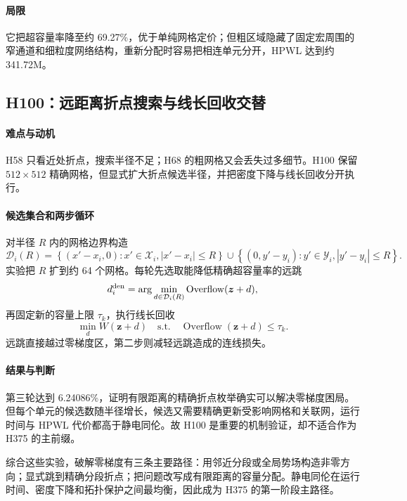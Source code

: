 \documentclass[UTF8,a4paper,11pt]{ctexrep}
\newcommand{\Overflow}{\operatorname{Overflow}}
\begin{document}
\paragraph{局限}
它把超容量率降至约 69.27\%，优于单纯网格定价；但粗区域隐藏了固定宏周围的窄通道和细粒度网络结构，重新分配时容易把相连单元分开，HPWL 达到约 341.72M。

\subsection{H100：远距离折点搜索与线长回收交替}
\paragraph{难点与动机}
H58 只看近处折点，搜索半径不足；H68 的粗网格又会丢失过多细节。H100 保留 $512\times512$ 精确网格，但显式扩大折点候选半径，并把密度下降与线长回收分开执行。

\paragraph{候选集合和两步循环}
对半径 $R$ 内的网格边界构造
\begin{equation}
 \mathcal D_i(R)=\left\{(x'-x_i,0):x'\in\mathcal X_i,
 |x'-x_i|\le R\right\}
 \cup\left\{(0,y'-y_i):y'\in\mathcal Y_i,
 |y'-y_i|\le R\right\}. \label{eq:widebreakpoints}
\end{equation}
实验把 $R$ 扩到约 64 个网格。每轮先选取能降低精确超容量率的远跳
\begin{equation}
 d_i^{\rm den}=\arg\min_{d\in\mathcal D_i(R)}
 \Overflow(\bm z+d), \label{eq:h100density}
\end{equation}
再固定新的容量上限 $\tau_k$，执行线长回收
\begin{equation}
 \min_d W(\bm z+d)
 \quad\text{s.t.}\quad\Overflow(\bm z+d)\le\tau_k. \label{eq:h100recover}
\end{equation}
远跳直接越过零梯度区，第二步则减轻远跳造成的连线损失。

\paragraph{结果与判断}
第三轮达到 6.24086\%，证明有限距离的精确折点枚举确实可以解决零梯度困局。但每个单元的候选数随半径增长，候选又需要精确更新受影响网格和关联网，运行时间与 HPWL 代价都高于静电同伦。故 H100 是重要的机制验证，却不适合作为 H375 的主前缀。

综合这些实验，破解零梯度有三条主要路径：用邻近分段或全局势场构造非零方向；显式跳到精确分段折点；把问题改写成有限距离的容量分配。静电同伦在运行时间、密度下降和拓扑保护之间最均衡，因此成为 H375 的第一阶段主路径。
\end{document}
